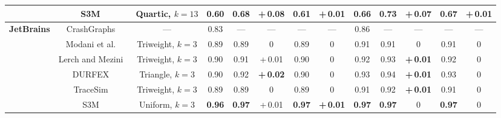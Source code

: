 \begin{table*}[t]
\begin{tabular}{@{}ccccccccccccc@{}}
\\
& S3M~\cite{s3m} &  Quartic, $k = 13$ & 
\textbf{0.60} & \textbf{0.68} & +\,0.08 & \textbf{0.61} & +\,0.01 &
\textbf{0.66} & \textbf{0.73} & +\,0.07 & \textbf{0.67} & +\,0.01
\\ 
\midrule
\multirow{6}{*}{\textbf{JetBrains}} 
& CrashGraphs~\cite{crash_graphs} &  — & 
0.83 & — & — & — & — &
0.86 & — & — & — & —
\\
& Modani et al.~\cite{modani} &  Triweight, $k = 3$ & 
0.89 & 0.89 & 0 & 0.89 & 0 &
0.91 & 0.91 & 0 & 0.91 & 0
\\
& Lerch and Mezini~\cite{lerch} &  Triweight, $k = 3$ & 
0.90 & 0.91 & +\,0.01 & 0.90 & 0 &
0.92 & 0.93 & \textbf{+\,0.01} & 0.92 & 0
\\
& DURFEX~\cite{durfex} &  Triangle, $k = 3$ & 
0.90 & 0.92 & \textbf{+\,0.02} & 0.90 & 0 &
0.93 & 0.94 & \textbf{+\,0.01} & 0.93 & 0
\\
& TraceSim~\cite{tracesim} &  Triweight, $k = 3$ & 
0.89 & 0.89 & 0 & 0.89 & 0 &
0.91 & 0.92 & \textbf{+\,0.01} & 0.91 & 0
\\
& S3M~\cite{s3m} &  Uniform, $k = 3$ & 
\textbf{0.96} & \textbf{0.97} & +\,0.01 & \textbf{0.97} & \textbf{+\,0.01} &
\textbf{0.97} & \textbf{0.97} & 0 & \textbf{0.97} & 0
\\ 
\bottomrule
\end{tabular}
\vspace{-0.2cm}
\label{tab:results}
\end{table*}